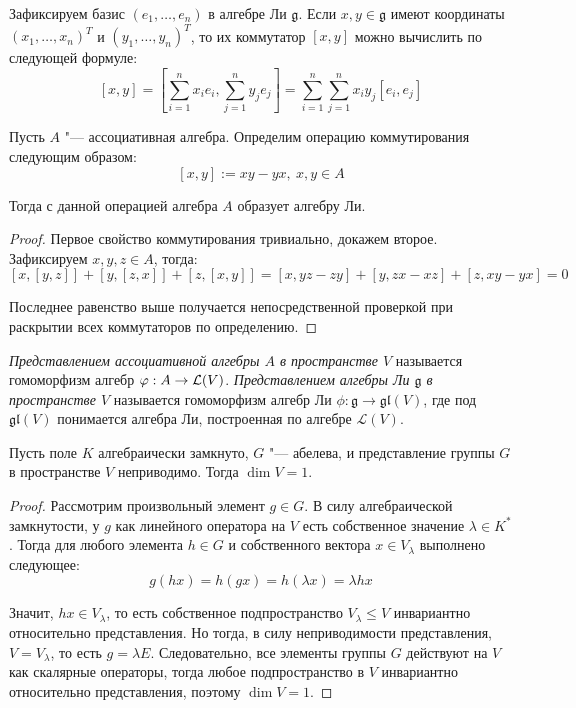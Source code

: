 \begin{note}
	Зафиксируем базис $(e_1, \dotsc, e_n)$ в алгебре Ли $\mathfrak g$. Если $x, y \in \mathfrak g$ имеют координаты $(x_1, \dotsc, x_n)^T$ и $(y_1, \dotsc, y_n)^T$, то их коммутатор $[x, y]$ можно вычислить по следующей формуле:
	\[[x, y] = \left[\sum_{i=1}^nx_ie_i, \sum_{j=1}^ny_je_j\right] = \sum_{i=1}^n\sum_{j=1}^nx_iy_j[e_i, e_j]\]
\end{note}

\begin{proposition}
	Пусть $A$ "--- ассоциативная алгебра. Определим операцию коммутирования следующим образом:
	\[[x, y] := xy - yx,~x, y \in A\]
	
	Тогда с данной операцией алгебра $A$ образует алгебру Ли.
\end{proposition}

\begin{proof}
	Первое свойство коммутирования тривиально, докажем второе. Зафиксируем $x, y, z \in A$, тогда:
	\[[x, [y, z]] + [y, [z, x]] + [z, [x, y]] = [x, yz - zy] + [y, zx - xz] + [z, xy - yx] = 0\]
	
	Последнее равенство выше получается непосредственной проверкой при раскрытии всех коммутаторов по определению.
\end{proof}

\begin{definition}
	\textit{Представлением ассоциативной алгебры $A$ в пространстве $V$} называется гомоморфизм алгебр $\varphi : A \to \mathcal L(V)$. \textit{Представлением алгебры Ли $\mathfrak g$ в пространстве $V$} называется гомоморфизм алгебр Ли $\phi : \mathfrak{g} \to \mathfrak{gl}(V)$, где под $\mathfrak{gl}(V)$ понимается алгебра Ли, построенная по алгебре $\mathcal L(V)$.
\end{definition}

\begin{proposition}
	Пусть поле $K$ алгебраически замкнуто, $G$ "--- абелева, и представление группы $G$ в пространстве $V$ неприводимо. Тогда $\dim {V} = 1$.
\end{proposition}

\begin{proof}
	Рассмотрим произвольный элемент $g \in G$. В силу алгебраической замкнутости, у $g$ как линейного оператора на $V$ есть собственное значение $\lambda \in K^*$. Тогда для любого элемента $h \in G$ и собственного вектора $x \in V_{\lambda}$ выполнено следующее:
	\[g(hx) = h(gx) = h(\lambda x) = \lambda hx\]
	
	Значит, $hx \in V_{\lambda}$, то есть собственное подпространство $V_{\lambda} \le V$ инвариантно относительно представления. Но тогда, в силу неприводимости представления, $V = V_{\lambda}$, то есть $g = \lambda E$. Следовательно, все элементы группы $G$ действуют на $V$ как скалярные операторы, тогда любое подпространство в $V$ инвариантно относительно представления, поэтому $\dim{V} = 1$.
\end{proof}


